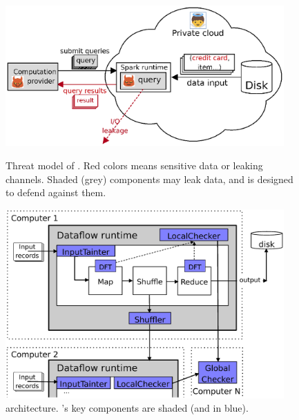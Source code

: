 \begin{figure}[h]
    \centering
    \begin{minipage}{.48\textwidth}    
          \vspace{-.1in}
        \includegraphics[width=0.95\textwidth]{figures/threat_private.ps}
         \vspace{-.1in}         
        \caption{Threat model of \kakute. Red colors means sensitive data or 
leaking channels. Shaded (grey) components may leak data, and \kakute is 
designed to defend against them.}
        \label{fig:falcon-arch}
    \end{minipage}
    \centering
    \begin{minipage}{0.48\textwidth}
         \vspace{-.1in}
        \includegraphics[width=0.95\textwidth]{figures/kakute_arch.ps}
         \vspace{-.4in}
        \caption{\kakute architecture. \kakute's key components are shaded 
(and in blue).}
        \label{fig:falcon-protocol}
    \end{minipage}
\end{figure}

